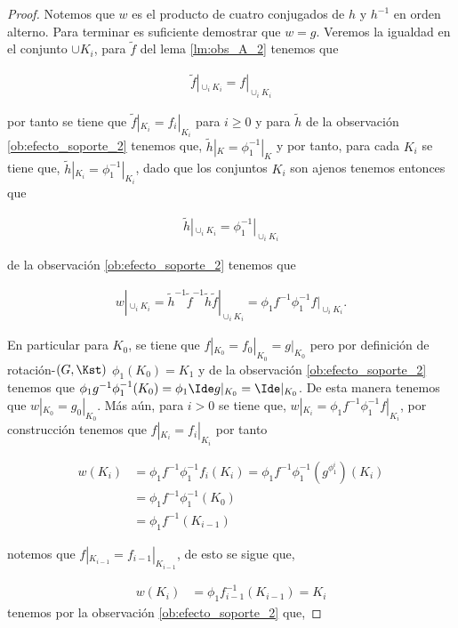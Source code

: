 \begin{proof}
Notemos que $w$ es el producto de cuatro conjugados de $h$ y $h^{-1}$ en orden alterno. Para terminar  es suficiente demostrar que $w = g$. Veremos la igualdad en el conjunto $\cup K_i$, para $\tilde{f}$ del lema \ref{lm:obs_A_2} tenemos que  

\begin{align*}
\tilde{f}|_{\cup_i K_i} = f|_{\cup_i K_i}
\end{align*}

por tanto se tiene que $\tilde{f}|_{K_i} = f_i|_{K_i}$ para $i \geq 0$ y  para $\tilde{h}$ de la observación \ref{ob:efecto_soporte_2} tenemos que, $\tilde{h}|_{K}=\phi_1^{-1}|_{K}$ y por tanto, para cada $K_i$ se tiene que, $\tilde{h}|_{ K_i}=\phi_1^{-1}|_{ K_i}$, dado que los conjuntos $K_i$ son ajenos tenemos entonces que

\begin{align*}
\tilde{h}|_{\cup_i K_i}=\phi_1^{-1}|_{\cup_i K_i}
\end{align*}

de la observación \ref{ob:efecto_soporte_2} tenemos que 


\begin{align*}
w|_{\cup_i K_i} =\tilde{h}^{-1}\tilde{f}^{-1}\tilde{h}\tilde{f}|_{\cup_i K_i} = \phi_1f^{-1}\phi_1^{-1}f|_{\cup_i K_i}.
\end{align*}

En particular para $K_0$, se tiene que $f|_{K_0}=f_0|_{K_0}=g|_{K_0}$ pero por definición de rotación-$(G,\Kst)$ $\phi_1(K_0)=K_1$ y de la observación \ref{ob:efecto_soporte_2} tenemos que $\phi_1g^{-1}\phi_1^{-1}(K_0)=\phi_1 \Ide g|_{K_0} =\Ide|_{K_0}$. De esta manera tenemos que $w|_{K_0}=g_0|_{K_0}.$ Más aún, para $i>0$ se tiene que, $w|_{K_i} = \phi_1f^{-1}\phi_1^{-1}f|_{ K_i}$, por construcción tenemos que $f|_{K_i}=f_i|_{K_{i}}$ por tanto

\begin{align*}
w(K_i) & = \phi_1f^{-1}\phi_1^{-1}f_i(K_i)=\phi_1f^{-1}\phi_1^{-1}(g^{\phi_1^i})(K_i)\\
& = \phi_1f^{-1}\phi_1^{-1}(K_0)\\
& = \phi_1f^{-1}(K_{i-1})
\end{align*} 

notemos que $f|_{K_{i-1}}=f_{i-1}|_{K_{i-1}}$, de esto se sigue que, 

\begin{align*}
w(K_i) &  = \phi_1f_{i-1}^{-1}(K_{i-1})=K_i
\end{align*} 
tenemos por la observación \ref{ob:efecto_soporte_2} que, 


\end{proof}
